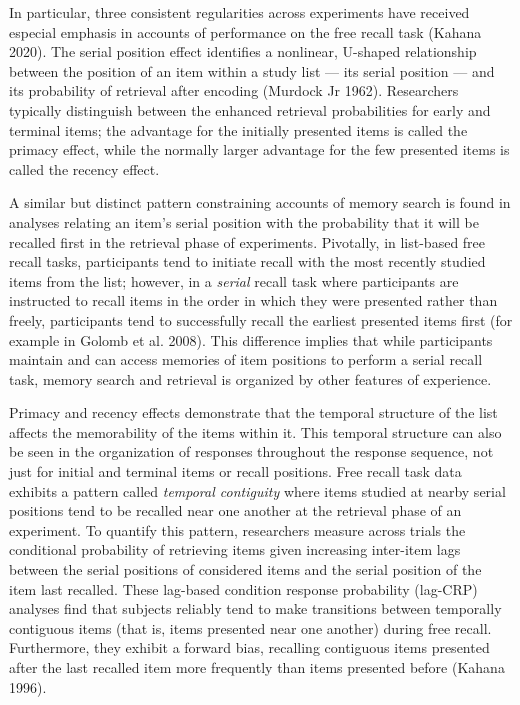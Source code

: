 \documentclass[
  letterpaper,
  DIV=11]{article}
\begin{document}
In particular, three consistent regularities across experiments have
received especial emphasis in accounts of performance on the free recall
task (Kahana 2020). The serial position effect identifies a nonlinear,
U-shaped relationship between the position of an item within a study
list --- its serial position --- and its probability of retrieval after
encoding (Murdock Jr 1962). Researchers typically distinguish between
the enhanced retrieval probabilities for early and terminal items; the
advantage for the initially presented items is called the primacy
effect, while the normally larger advantage for the few presented items
is called the recency effect.

A similar but distinct pattern constraining accounts of memory search is
found in analyses relating an item's serial position with the
probability that it will be recalled first in the retrieval phase of
experiments. Pivotally, in list-based free recall tasks, participants
tend to initiate recall with the most recently studied items from the
list; however, in a \emph{serial} recall task where participants are
instructed to recall items in the order in which they were presented
rather than freely, participants tend to successfully recall the
earliest presented items first (for example in Golomb et al. 2008). This
difference implies that while participants maintain and can access
memories of item positions to perform a serial recall task, memory
search and retrieval is organized by other features of experience.

Primacy and recency effects demonstrate that the temporal structure of
the list affects the memorability of the items within it. This temporal
structure can also be seen in the organization of responses throughout
the response sequence, not just for initial and terminal items or recall
positions. Free recall task data exhibits a pattern called
\emph{temporal contiguity} where items studied at nearby serial
positions tend to be recalled near one another at the retrieval phase of
an experiment. To quantify this pattern, researchers measure across
trials the conditional probability of retrieving items given increasing
inter-item lags between the serial positions of considered items and the
serial position of the item last recalled. These lag-based condition
response probability (lag-CRP) analyses find that subjects reliably tend
to make transitions between temporally contiguous items (that is, items
presented near one another) during free recall. Furthermore, they
exhibit a forward bias, recalling contiguous items presented after the
last recalled item more frequently than items presented before (Kahana
1996).
\end{document}
